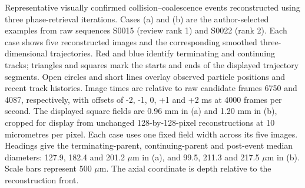 Representative visually confirmed collision--coalescence events reconstructed using three phase-retrieval iterations. Cases (a) and (b) are the author-selected examples from raw sequences S0015 (review rank 1) and S0022 (rank 2). Each case shows five reconstructed images and the corresponding smoothed three-dimensional trajectories. Red and blue identify terminating and continuing tracks; triangles and squares mark the starts and ends of the displayed trajectory segments. Open circles and short lines overlay observed particle positions and recent track histories. Image times are relative to raw candidate frames 6750 and 4087, respectively, with offsets of -2, -1, 0, +1 and +2 ms at 4000 frames per second. The displayed square fields are 0.96 mm in (a) and 1.20 mm in (b), cropped for display from unchanged 128-by-128-pixel reconstructions at 10 micrometres per pixel. Each case uses one fixed field width across its five images. Headings give the terminating-parent, continuing-parent and post-event median diameters: 127.9, 182.4 and 201.2 \(\mu\mathrm{m}\) in (a), and 99.5, 211.3 and 217.5 \(\mu\mathrm{m}\) in (b). Scale bars represent 500 \(\mu\mathrm{m}\). The axial coordinate is depth relative to the reconstruction front.
